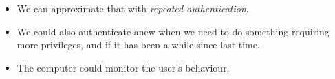 \begin{frame}
  \begin{solution}
    \begin{itemize}
      \item We can approximate that with \emph{repeated authentication}.

      \item We could also authenticate anew when we need to do something 
        requiring more privileges, and if it has been a while since last time.

      \item The computer could monitor the user's behaviour.
    \end{itemize}
  \end{solution}
\end{frame}




\begin{frame}[allowframebreaks]
	\small
  \printbibliography
\end{frame}

